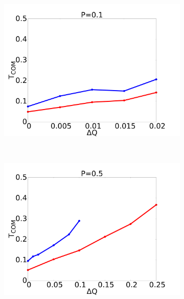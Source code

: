 \documentclass[12pt]{article}
\begin{document}
\begin{figure}[h]
    \begin{center}
        \begin{subfigure}[t]{0.3\textwidth}
            \includegraphics[scale=0.13]{images/p01_com.pdf}
        \end{subfigure} 
        \
        \begin{subfigure}[t]{0.3\textwidth}
            \includegraphics[scale=0.13]{images/p05_com.pdf}
        \end{subfigure} 
        \
        \begin{subfigure}[t]{0.3\textwidth}

\end{subfigure}
\end{center}
\end{figure}
\end{document}
